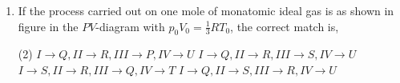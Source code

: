 
\begin{enumerate}
    \item If the process carried out on one mole of monatomic ideal gas is as shown in figure in the $PV$-diagram with $p_0V_0 = \frac{1}{3}RT_0$, the correct match is,
        \begin{center}
        \end{center}
        \begin{tasks}(2)
            \task \(I \to Q, II \to R, III \to P, IV \to U\)
            \task \(I \to Q, II \to R, III \to S, IV \to U\)
            \task \(I \to S, II \to R, III \to Q, IV \to T\)
            \task \(I \to Q, II \to S, III \to R, IV \to U\)
        \end{tasks}
\end{enumerate}
